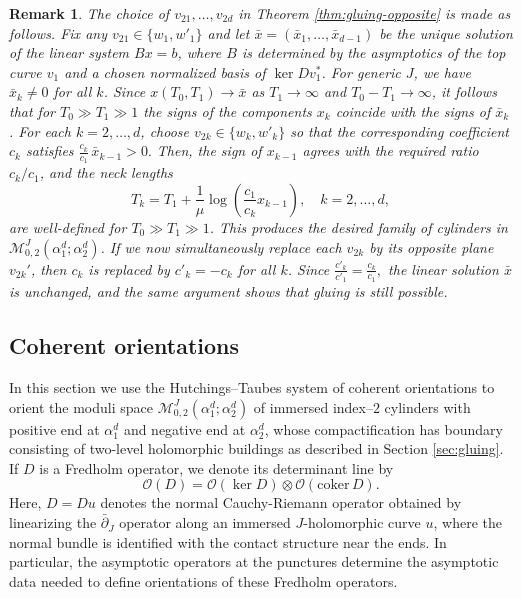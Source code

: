 \documentclass{amsart}
\newcommand{\M}{\mathcal{M}}
\newtheorem{rem}[theorem]{Remark}
\begin{document}
\begin{rem}
The choice of $v_{21},\dots,v_{2d}$ in Theorem \ref{thm:gluing-opposite} is made as follows.
Fix any $v_{21} \in \{w_1,w'_1\}$ and let
$\bar x=(\bar x_1,\dots,\bar x_{d-1})
$ be the unique solution of the linear system $Bx=b$, where $B$
is determined by the asymptotics of the top curve $v_1$ and a
chosen normalized basis of $\ker Dv_1^*$. For generic $J$, we have $\bar x_k \neq 0$ for all $k$.
Since $x(T_0,T_1)\to \bar x$ as $T_1\to\infty$ and
$T_0-T_1\to\infty$, it follows that for $T_0\gg T_1\gg1$
the signs of the components $x_k$ coincide with the signs of
$\bar x_k$. For each $k=2,\dots,d$, choose $v_{2k}\in\{w_k,w'_k\}$ so that the
corresponding coefficient $c_k$ satisfies $\frac{c_k}{c_1}\,\bar x_{k-1}>0.$
Then, the sign of $x_{k-1}$ agrees with the required ratio
$c_k/c_1$, and the neck lengths
$$
T_k = T_1 + \frac{1}{\mu}
\log\left(\frac{c_1}{c_k}x_{k-1}\right), \quad k=2,\ldots,d,
$$
are well-defined for $T_0\gg T_1\gg 1$.
This produces the desired family of cylinders in
$\mathcal M^{J}_{0,2}(\alpha_1^d;\alpha_2^d)$.
If we now simultaneously replace each $v_{2k}$ by its opposite plane
$v_{2k}'$, then $c_k$ is replaced by $c'_k=-c_k$ for all $k$.
Since
$
\frac{c'_k}{c'_1}=\frac{c_k}{c_1},
$
the linear solution $\bar x$ is unchanged, and the same argument
shows that gluing is still possible.  
\end{rem}



\subsection{Coherent orientations}


In this section we use the Hutchings--Taubes system of coherent orientations \cite{hutchings2009}
to orient the moduli space
$\M^J_{0,2}(\alpha_1^d;\alpha_2^d)$ of immersed index--$2$ cylinders with positive end at $\alpha_1^d$ and negative end
at $\alpha_2^d$, whose compactification has boundary consisting of two-level
holomorphic buildings as described in Section \ref{sec:gluing}.
If $D$ is a Fredholm operator, we denote its determinant line by
$$
\mathcal{O}(D)
=
\mathcal{O}(\ker D)\otimes \mathcal{O}(\mathrm{coker}\, D).
$$
Here, $D=Du$ denotes the normal Cauchy-Riemann operator obtained by linearizing the
$\bar\partial_J$ operator along an immersed $J$-holomorphic curve $u$, where the normal
bundle is identified with the contact structure near the ends. In particular, the asymptotic
operators at the punctures determine the asymptotic data needed to define orientations of these
Fredholm operators.
\end{document}
